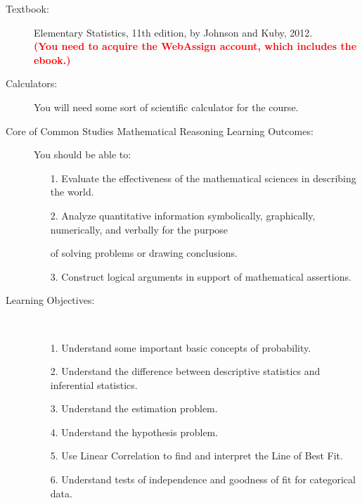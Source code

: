 \documentclass[10pt]{article}
\begin{document}
\begin{description}

\item[Textbook:] Elementary Statistics, 11th edition, by Johnson and Kuby, 2012.\\
\textbf{\textcolor{red}{(You need to acquire the WebAssign account, which includes the ebook.)}}
\vspace{-.1in}
\item[Calculators:] You will need some sort of scientific calculator for the course.
\item[Core of Common Studies Mathematical Reasoning Learning Outcomes:] You should be able to:\vspace{-.1in}
\begin{itemize}
\item[1.] Evaluate the effectiveness of the mathematical sciences in describing the world.\vspace{-.1in}
\item[2.] Analyze quantitative information symbolically, graphically, numerically, and verbally for the purpose \vspace{-.1in}
\item[] of solving problems or drawing conclusions.\vspace{-.1in}
\item[3.] Construct logical arguments in support of mathematical assertions. \vspace{-.1in}
\end{itemize}

\item[Learning Objectives:] \ \vspace{-.1in}
\begin{itemize}
\item[1.] Understand some important basic concepts of probability.\vspace{-.1in}
\item[2.] Understand the difference between descriptive statistics and inferential statistics.\vspace{-.1in}
\item[3.] Understand the estimation problem.\vspace{-.1in}
\item[4.] Understand the hypothesis problem.\vspace{-.1in}
\item[5.] Use Linear Correlation to find and interpret the Line of Best Fit.\vspace{-.1in}
\item[6.] Understand tests of independence and goodness of fit for categorical data.
\end{itemize}


\end{description}
\end{document}
